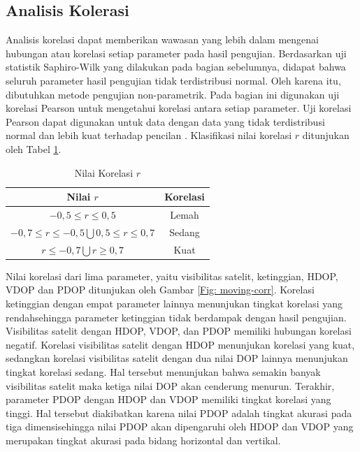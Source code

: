 \subsection{Analisis Kolerasi}

Analisis korelasi dapat memberikan wawasan yang lebih dalam mengenai hubungan atau korelasi setiap parameter pada hasil pengujian. Berdasarkan uji statistik Saphiro-Wilk yang dilakukan pada bagian sebelumnya, didapat bahwa seluruh parameter hasil pengujian tidak terdistribusi normal. Oleh karena itu, dibutuhkan metode pengujian non-parametrik. Pada bagian ini digunakan uji korelasi Pearson untuk mengetahui korelasi antara setiap parameter. Uji korelasi Pearson dapat digunakan untuk data dengan data yang tidak terdistribusi normal dan lebih kuat terhadap pencilan \cite{Schober2018}. Klasifikasi nilai korelasi $r$ ditunjukan oleh Tabel \ref{Tab: korelasi-table}.

\begin{table}[H]
	\caption{Nilai Korelasi $r$ \cite{Carlton2012}}
	\vspace{0.5em}
	\centering
	\begin{tabular}{cc}
		\hline
		\textbf{Nilai $r$} & \textbf{Korelasi}\\
		\hline 
		$-0,5 \leq r \leq 0,5$ & Lemah \\ 
		$ -0,7 \le r \le -0,5 \bigcup 0,5 \le r \le 0,7$ & Sedang \\
		$r \leq -0,7 \bigcup r \geq 0,7$ & Kuat \\
		\hline
	\end{tabular}
	\label{Tab: korelasi-table}
\end{table}

Nilai korelasi dari lima parameter, yaitu visibilitas satelit, ketinggian, HDOP, VDOP dan PDOP ditunjukan oleh Gambar \ref{Fig: moving-corr}. Korelasi ketinggian dengan empat parameter lainnya menunjukan tingkat korelasi yang rendahsehingga parameter ketinggian tidak berdampak dengan hasil pengujian.  Visibilitas satelit dengan HDOP, VDOP, dan PDOP memiliki hubungan korelasi negatif. Korelasi visibilitas satelit dengan HDOP menunjukan korelasi yang kuat, sedangkan korelasi visibilitas satelit dengan dua nilai DOP lainnya menunjukan tingkat korelasi sedang. Hal tersebut menunjukan bahwa semakin banyak visibilitas satelit maka ketiga nilai DOP akan cenderung menurun. Terakhir, parameter PDOP dengan HDOP dan VDOP memiliki tingkat korelasi yang tinggi. Hal tersebut diakibatkan karena nilai PDOP adalah tingkat akurasi pada tiga dimensisehingga nilai PDOP akan dipengaruhi oleh HDOP dan VDOP yang merupakan tingkat akurasi pada bidang horizontal dan vertikal.

